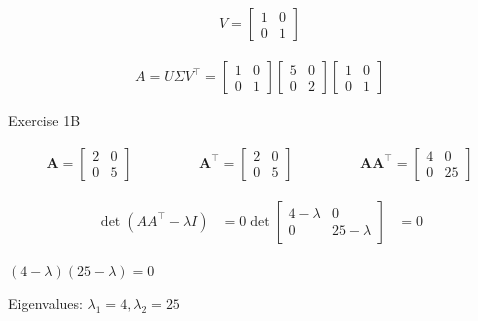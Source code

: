 \documentclass[11pt,letterpaper]{article}
\begin{document}
\begin{enumerate}
\begin{align*}
V = {\begin{bmatrix}
        1 & 0 \\
        0 & 1
    \end{bmatrix}}
\end{align*}

\begin{align*}
A = U \Sigma V^\top
= \begin{bmatrix}
        1 & 0 \\
        0 & 1
    \end{bmatrix}
    \begin{bmatrix}
        5 & 0 \\
        0 & 2
    \end{bmatrix}
    \begin{bmatrix}
        1 & 0 \\
        0 & 1
    \end{bmatrix}
\end{align*}

\noindent\dotfill Exercise 1B \noindent\dotfill

\begin{align*}
    \mathbf{A} 
    = \begin{bmatrix}
        2 & 0 \\
        0 & 5
    \end{bmatrix}
    \hspace{2cm}
    \mathbf{A^\top} 
    = \begin{bmatrix}
        2 & 0 \\
        0 & 5
    \end{bmatrix}
    \hspace{2cm}
    \mathbf{A A^\top} 
    = \begin{bmatrix}
        4 & 0 \\
        0 & 25
    \end{bmatrix}
\end{align*}

\begin{align*}
\det{(AA^\top - \lambda I)} &= 0
\det{\begin{bmatrix}
        4-\lambda & 0 \\
        0 & 25-\lambda
    \end{bmatrix}} &= 0
\end{align*}

\( (4 - \lambda)(25 - \lambda) = 0 \)

Eigenvalues: \( \lambda_1 = 4, \lambda_2 = 25 \)


\end{enumerate}
\end{document}
